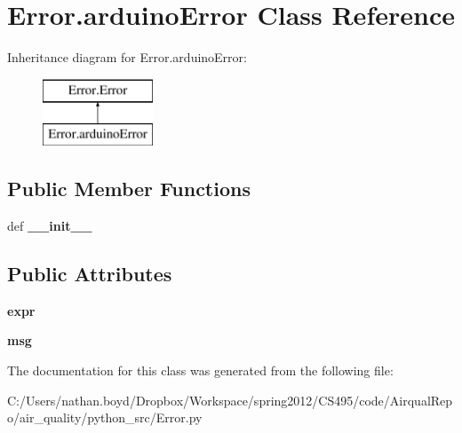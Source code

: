 \hypertarget{class_error_1_1arduino_error}{\section{Error.\-arduino\-Error Class Reference}
\label{class_error_1_1arduino_error}
}
Inheritance diagram for Error.\-arduino\-Error\-:\begin{figure}[H]
\begin{center}
\leavevmode
\includegraphics[height=2.000000cm]{class_error_1_1arduino_error}
\end{center}
\end{figure}
\subsection*{Public Member Functions}
\begin{DoxyCompactItemize}
\item 
\hypertarget{class_error_1_1arduino_error_af4c491b29579c8b181813815e7e8914b}{def {\bfseries \-\_\-\-\_\-init\-\_\-\-\_\-}}\label{class_error_1_1arduino_error_af4c491b29579c8b181813815e7e8914b}

\end{DoxyCompactItemize}
\subsection*{Public Attributes}
\begin{DoxyCompactItemize}
\item 
\hypertarget{class_error_1_1arduino_error_abd38cfdb82bda4f911c41d018130a3d0}{{\bfseries expr}}\label{class_error_1_1arduino_error_abd38cfdb82bda4f911c41d018130a3d0}

\item 
\hypertarget{class_error_1_1arduino_error_aa963133e309f1c2240e98e81d9c092e0}{{\bfseries msg}}\label{class_error_1_1arduino_error_aa963133e309f1c2240e98e81d9c092e0}

\end{DoxyCompactItemize}


The documentation for this class was generated from the following file\-:\begin{DoxyCompactItemize}
\item 
C\-:/\-Users/nathan.\-boyd/\-Dropbox/\-Workspace/spring2012/\-C\-S495/code/\-Airqual\-Repo/air\-\_\-quality/python\-\_\-src/Error.\-py\end{DoxyCompactItemize}
